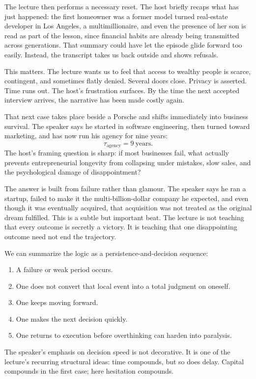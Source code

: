 The lecture then performs a necessary reset. The host briefly recaps what has just happened: the first homeowner was a former model turned real-estate developer in Los Angeles, a multimillionaire, and even the presence of her son is read as part of the lesson, since financial habits are already being transmitted across generations. That summary could have let the episode glide forward too easily. Instead, the transcript takes us back outside and shows refusals.

This matters. The lecture wants us to feel that access to wealthy people is scarce, contingent, and sometimes flatly denied. Several doors close. Privacy is asserted. Time runs out. The host's frustration surfaces. By the time the next accepted interview arrives, the narrative has been made costly again.

That next case takes place beside a Porsche and shifts immediately into business survival. The speaker says he started in software engineering, then turned toward marketing, and has now run his agency for nine years:
\begin{equation}
\tau_{\text{agency}} = 9\ \text{years}.
\end{equation}
The host's framing question is sharp: if most businesses fail, what actually prevents entrepreneurial longevity from collapsing under mistakes, slow sales, and the psychological damage of disappointment?

The answer is built from failure rather than glamour. The speaker says he ran a startup, failed to make it the multi-billion-dollar company he expected, and even though it was eventually acquired, that acquisition was not treated as the original dream fulfilled. This is a subtle but important beat. The lecture is not teaching that every outcome is secretly a victory. It is teaching that one disappointing outcome need not end the trajectory.

We can summarize the logic as a persistence-and-decision sequence:
\begin{enumerate}
\item A failure or weak period occurs.
\item One does not convert that local event into a total judgment on oneself.
\item One keeps moving forward.
\item One makes the next decision quickly.
\item One returns to execution before overthinking can harden into paralysis.
\end{enumerate}
The speaker's emphasis on decision speed is not decorative. It is one of the lecture's recurring structural ideas: time compounds, but so does delay. Capital compounds in the first case; here hesitation compounds.

